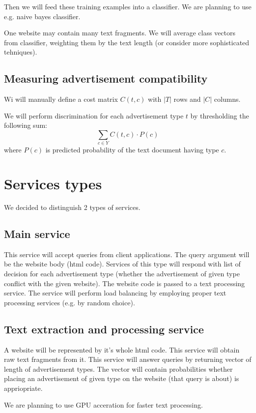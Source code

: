 \documentclass[a4paper]{article}
\begin{document}
Then we will feed these training examples into a classifier.
We are planning to use e.g. naive bayes classifier.

One website may contain many text fragments.
We will average class vectors from classifier,
weighting them by the text length
(or consider more sophisticated tehniques).


\subsection{Measuring advertisement compatibility}

Wi will manually define a cost matrix $C(t, c)$ 
with $|T|$ rows and $|C|$ columns.

We will perform discrimination for each advertisement type $t$
by thresholding the following sum:
\begin{equation}
    \sum_{c\in{Y}} {C(t, c) \cdot P(c)}
\end{equation}
where $P(c)$ is predicted probability of the text document having type $c$.



\section{Services types}
We decided to distinguish 2 types of services.

\subsection{Main service}
This service will accept queries from client applications.
The query argument will be the website body (html code).
Services of this type will respond with list of decision for each advertisement type
(whether the advertisement of given type conflict with the given website).
The website code is passed to a text processing service.
The service will perform load balancing by employing proper text processing services
(e.g. by random choice).


\subsection{Text extraction and processing service}
A website will be represented by it's whole html code.
This service will obtain raw text fragments from it.
This service will answer queries by returning vector of length of advertisement types.
The vector will contain probabilities whether placing an advertisement of given type
on the website (that query is about) is appriopriate.

We are planning to use GPU acceration for faster text processing.
\end{document}
